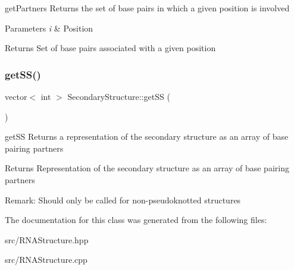 get\+Partners Returns the set of base pairs in which a given position is involved 


\begin{DoxyParams}{Parameters}
{\em i} & Position \\
\hline
\end{DoxyParams}
\begin{DoxyReturn}{Returns}
Set of base pairs associated with a given position 
\end{DoxyReturn}
\mbox{\label{class_secondary_structure_ab085ea78fe168b4f37a3abcfcea1526c}} 
\subsubsection{\texorpdfstring{get\+S\+S()}{getSS()}}
{\footnotesize\ttfamily vector$<$ int $>$ Secondary\+Structure\+::get\+SS (\begin{DoxyParamCaption}{ }\end{DoxyParamCaption})}



get\+SS Returns a representation of the secondary structure as an array of base pairing partners 

\begin{DoxyReturn}{Returns}
Representation of the secondary structure as an array of base pairing partners
\end{DoxyReturn}
Remark\+: Should only be called for non-\/pseudoknotted structures 

The documentation for this class was generated from the following files\+:\begin{DoxyCompactItemize}
\item 
src/R\+N\+A\+Structure.\+hpp\item 
src/R\+N\+A\+Structure.\+cpp\end{DoxyCompactItemize}
